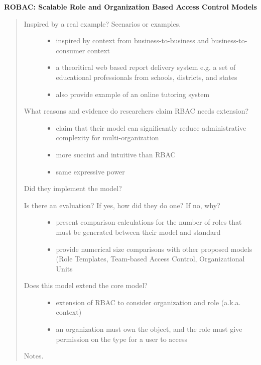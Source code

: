 \documentclass[letterpaper,10pt,english]{sphinxmanual}
\begin{document}
\textbf{ROBAC: Scalable Role and Organization Based Access Control Models}
\begin{quote}
\begin{description}
\item[{Inspired by a real example? Scenarios or examples.}] \leavevmode\begin{itemize}
\item {} 
inspired by context from business-to-business and business-to-consumer context

\item {} 
a theoritical web based report delivery system e.g. a set of educational professionals from schools, districts, and states

\item {} 
also provide example of an online tutoring system

\end{itemize}

\item[{What reasons and evidence do researchers claim RBAC needs extension?}] \leavevmode\begin{itemize}
\item {} 
claim that their model can significantly reduce administrative complexity for multi-organization

\item {} 
more succint and intuitive than RBAC

\item {} 
same expressive power

\end{itemize}

\end{description}

Did they implement the model?
\begin{description}
\item[{Is there an evaluation? If yes, how did they do one? If no, why?}] \leavevmode\begin{itemize}
\item {} 
present comparison calculations for the number of roles that must be generated between their model and standard

\item {} 
provide numerical size comparisons with other proposed models (Role Templates, Team-based Access Control, Organizational Units

\end{itemize}

\item[{Does this model extend the core model?}] \leavevmode\begin{itemize}
\item {} 
extension of RBAC to consider organization and role (a.k.a. context)

\item {} 
an organization must own the object, and the role must give permission on the type for a user to access

\end{itemize}

\end{description}

Notes.
\end{quote}
\end{document}
